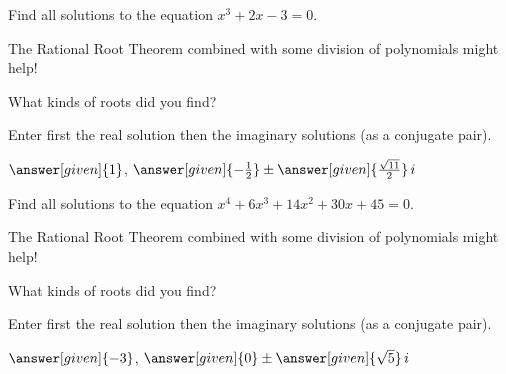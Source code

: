 \documentclass[nooutcomes]{ximera}
\begin{document}
\begin{problem}
Find all solutions to the equation $x^3+2x-3=0$. 
\begin{hint} 
The Rational Root Theorem combined with some division of polynomials might help!
\end{hint}
What kinds of roots did you find? 
\begin{multipleChoice}
\end{multipleChoice}
\begin{problem}
Enter first the real solution then the imaginary solutions (as a conjugate pair).

\begin{prompt}
$\answer[given]{1}$, $\answer[given]{-\frac{1}{2}} \pm \answer[given]{\frac{\sqrt{11}}{2}}\,i$
\end{prompt}
\end{problem}
\end{problem}


\begin{problem}
Find all solutions to the equation $x^4+6x^3+14x^2+30x+45=0$. 
\begin{hint} 
The Rational Root Theorem combined with some division of polynomials might help!
\end{hint}
What kinds of roots did you find? 
\begin{multipleChoice}
\end{multipleChoice}
\begin{problem}
Enter first the real solution then the imaginary solutions (as a conjugate pair).

\begin{prompt}
$\answer[given]{-3}$, $\answer[given]{0} \pm \answer[given]{\sqrt{5}}\,i$
\end{prompt}
\end{problem}
\end{problem}
\end{document}
